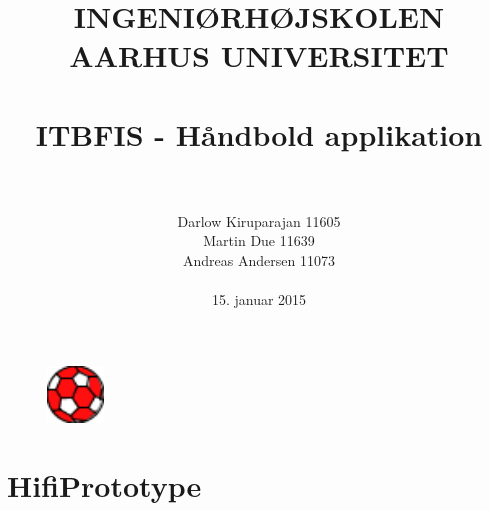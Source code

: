\documentclass[paper=a4, fontsize=11pt]{scrartcl}	%
\title{
		\usefont{OT1}{bch}{b}{n}
		\normalfont \normalsize \textsc{INGENIØRHØJSKOLEN AARHUS UNIVERSITET} \\ [25pt]
		\horrule{0.5pt} \\[0.4cm]
		\huge ITBFIS - Håndbold applikation \\
		\horrule{2pt} \\[0.5cm]
}
\author{
		\normalfont 								\normalsize
        Darlow Kiruparajan 11605\\\normalsize Martin Due 11639\\\normalsize Andreas Andersen 11073\\\\[-3pt]		\normalsize
        15. januar 2015
}
\date{}
\numberwithin{equation}{section}		%
\numberwithin{figure}{section}			%
\numberwithin{table}{section}				%
\begin{document}
\maketitle
\begin{figure}[ht!]
		\centering
		\includegraphics[width=15mm]{images/handballl}
		\end{figure}


\newpage
\renewcommand{\figurename}{Figur}
\renewcommand\contentsname{Indholdsfortegnelse}
\tableofcontents

\newpage
\section*{HifiPrototype}


\end{document}
